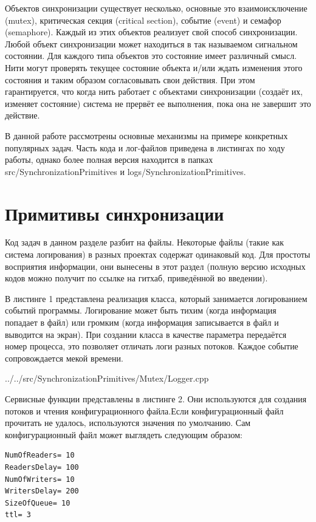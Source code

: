 \documentclass[a4paper, 12pt]{article}		%
\begin{document}
Объектов синхронизации существует несколько, основные это взаимоисключение (mutex), критическая секция (critical section), событие (event) и семафор (semaphore). Каждый из этих объектов реализует свой способ синхронизации. Любой объект синхронизации может находиться в так называемом сигнальном состоянии. Для каждого типа объектов это состояние имеет различный смысл. Нити могут проверять текущее состояние объекта и/или ждать изменения этого состояния и таким образом согласовывать свои действия. При этом гарантируется, что когда нить работает с объектами синхронизации (создаёт их, изменяет состояние) система не прервёт ее выполнения, пока она не завершит это действие. 

В данной работе рассмотрены основные механизмы на примере конкретных популярных задач. Часть кода и лог-файлов приведена в листингах по ходу работы, однако более полная версия находится в папках src/SynchronizationPrimitives и logs/SynchronizationPrimitives.

\newpage
\section{Примитивы синхронизации}

Код задач в данном разделе разбит на файлы. Некоторые файлы (такие как система логирования) в разных проектах содержат одинаковый код. Для простоты восприятия информации, они вынесены в этот раздел (полную версию исходных кодов можно получит по ссылке на гитхаб, приведённой во введении).

В листинге 1 представлена реализация класса, который занимается логированием событий программы. Логирование может быть тихим (когда информация попадает в файл) или громким (когда информация записывается в файл и выводится на экран). При создании класса в качестве параметра передаётся номер процесса, это позволяет отличать логи разных потоков. Каждое событие сопровождается мекой времени.


{../../src/SynchronizationPrimitives/Mutex/Logger.cpp}

Сервисные функции представлены в листинге 2. Они используются для создания потоков и чтения конфигурационного файла.Если конфигурационный файл прочитать не удалось, используются значения по умолчанию. Сам конфигурационный файл может выглядеть следующим образом:
\begin{verbatim}
NumOfReaders= 10
ReadersDelay= 100
NumOfWriters= 10
WritersDelay= 200
SizeOfQueue= 10
ttl= 3
\end{verbatim}
\end{document}
